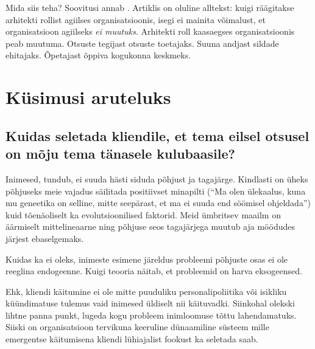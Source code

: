 Mida siis teha? Soovitusi annab \cite{fowlerlean}. Artiklis on oluline alltekst: kuigi räägitakse arhitekti rollist agiilses organisatsioonis, isegi ei mainita võimalust, et organisatsioon agiilseks \emph{ei muutuks}. Arhitekti roll kaasaegses organisatsioonis peab muutuma. Otsuste tegijast otsuste toetajaks. Suuna andjast sildade ehitajaks. Õpetajast õppiva kogukonna keskmeks. 

\section{Küsimusi aruteluks}
\subsection{Kuidas seletada kliendile, et tema eilsel otsusel on mõju tema tänasele kulubaasile?}
\label{sec:business:q1}
Inimesed, tundub, ei suuda hästi siduda põhjust ja tagajärge. Kindlasti on üheks põhjuseks meie vajadus säilitada positiivset minapilti (\enquote{Ma olen ülekaalus, kuna mu geneetika on selline, mitte seepärast, et ma ei suuda end söömisel ohjeldada}) kuid tõenäoliselt ka evolutsioonilised faktorid. Meid ümbritsev maailm on äärmiselt mittelineaarne ning põhjuse seos tagajärjega muutub aja möödudes järjest ebaselgemaks. 

Kuidas ka ei oleks, inimeste esimene järeldus probleemi põhjuste osas ei ole reeglina endogeenne. Kuigi teooria näitab, et probleemid on harva eksogeensed. 

Ehk, kliendi käitumine ei ole mitte puuduliku personalipoliitika või isikliku küündimatuse tulemus vaid inimesed üldiselt nii käituvadki. Siinkohal olekski lihtne panna punkt, lugeda kogu probleem inimloomuse tõttu lahendamatuks. Siiski on organisatsioon tervikuna keeruline dünaamiline süsteem mille emergentse käitumisena kliendi lühiajalist fookust ka seletada saab. 

